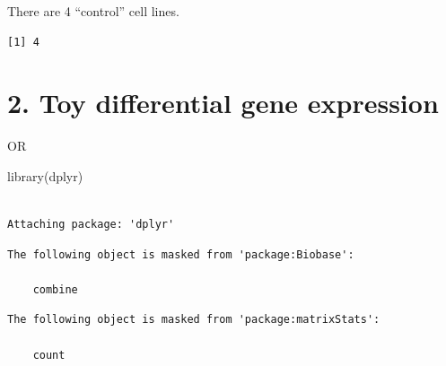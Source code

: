 \documentclass[
  letterpaper,
  DIV=11,
  numbers=noendperiod]{scrartcl}
\newenvironment{Shaded}{\begin{snugshade}}{\end{snugshade}}
\newcommand{\CommentTok}[1]{\textcolor[rgb]{0.37,0.37,0.37}{#1}}
\newcommand{\DecValTok}[1]{\textcolor[rgb]{0.68,0.00,0.00}{#1}}
\newcommand{\FunctionTok}[1]{\textcolor[rgb]{0.28,0.35,0.67}{#1}}
\newcommand{\NormalTok}[1]{\textcolor[rgb]{0.00,0.23,0.31}{#1}}
\newcommand{\OtherTok}[1]{\textcolor[rgb]{0.00,0.23,0.31}{#1}}
\newcommand{\SpecialCharTok}[1]{\textcolor[rgb]{0.37,0.37,0.37}{#1}}
\newcommand{\StringTok}[1]{\textcolor[rgb]{0.13,0.47,0.30}{#1}}
\begin{document}
There are 4 ``control'' cell lines.

\begin{Shaded}
\end{Shaded}

\begin{verbatim}
[1] 4
\end{verbatim}

\section{2. Toy differential gene
expression}\label{toy-differential-gene-expression}

\begin{Shaded}
\end{Shaded}

OR

\begin{Shaded}
\begin{Highlighting}[]
\FunctionTok{library}\NormalTok{(dplyr)}
\end{Highlighting}
\end{Shaded}

\begin{verbatim}

Attaching package: 'dplyr'
\end{verbatim}

\begin{verbatim}
The following object is masked from 'package:Biobase':

    combine
\end{verbatim}

\begin{verbatim}
The following object is masked from 'package:matrixStats':

    count
\end{verbatim}
\end{document}
